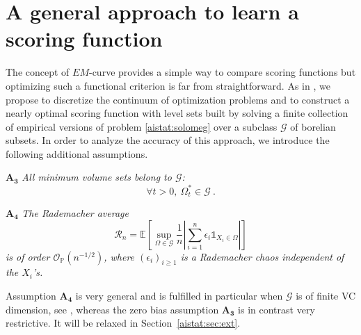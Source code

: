 \section{A general approach to learn a scoring function}\label{aistat:sec:estim}

The concept of $EM$-curve provides a simple way to compare scoring functions but optimizing such a functional criterion is far from straightforward. As in \cite{CLEM13}, we propose to discretize the continuum of optimization problems and to construct a nearly optimal scoring function with level sets built by solving a finite collection of empirical versions of problem \eqref{aistat:solomeg}
over a subclass $\mathcal{G}$ of borelian subsets. In order to analyze the accuracy of this approach, we introduce the following additional assumptions.

\noindent $\mathbf{A_3}$ {\it All minimum volume sets belong to $\mathcal{G}$: $$\forall t >0,~ \Omega_t^* \in \mathcal{G}~.$$} 

\noindent $\mathbf{A_4} $ {\it The Rademacher average
 $$\mathcal{R}_n=\mathbb{E} \left[ \sup_{\Omega \in \mathcal{G}}
    \frac{1}{n} \left| \sum_{i=1}^n \epsilon_i \mathds{1}_{X_i \in
        \Omega} \right| \right]$$ is of order $\mathcal{O}_{\mathbb{P}}(n^{-1/2})$, where $(\epsilon_i)_{i \ge 1}$ is a Rademacher chaos independent of the $X_i$'s.}
        
Assumption $\mathbf{A_4}$ is very general and is fulfilled in particular when $\mathcal{G}$ is of finite VC dimension, see \cite{Kolt06}, whereas the zero bias assumption $\mathbf{A_3}$ is in contrast very restrictive. It will be relaxed in Section~\ref{aistat:sec:ext}. 

